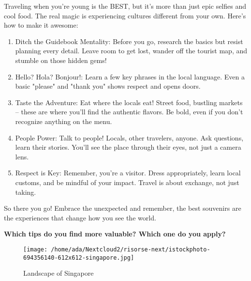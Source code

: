 \documentclass[]{article} %
\begin{document}
Traveling when you're young is the BEST, but it's more than just epic selfies and cool food. The real magic is experiencing cultures different from your own. Here's how to make it awesome:
\begin{enumerate}
	
	\item{ Ditch the Guidebook Mentality: Before you go, research the basics but resist planning every detail. Leave room to get lost, wander off the tourist map, and stumble on those hidden gems!}
	\item{ Hello? Hola? Bonjour!: Learn a few key phrases in the local language. Even a basic "please" and "thank you" shows respect and opens doors.}
	\item{ Taste the Adventure: Eat where the locals eat! Street food, bustling markets – these are where you'll find the authentic flavors. Be bold, even if you don't recognize anything on the menu.}
	\item{ People Power: Talk to people! Locals, other travelers, anyone. Ask questions, learn their stories. You'll see the place through their eyes, not just a camera lens.}
	\item{ Respect is Key: Remember, you're a visitor. Dress appropriately, learn local customs, and be mindful of your impact. Travel is about exchange, not just taking.}
\end{enumerate}


So there you go! Embrace the unexpected and remember, the best souvenirs are the experiences that change how you see the world.
\vspace{1cm}
\begin{question}
	\textbf{Which tips do you find more valuable? Which one do you apply?}
\end{question}

\vspace{4cm}

\begin{figure}[htb]
	\centering
	\texttt{[image: /home/ada/Nextcloud2/risorse-next/istockphoto-694356140-612x612-singapore.jpg]}
	\caption {Landscape of Singapore}
\end{figure}

\fi 
	
\end{document}
